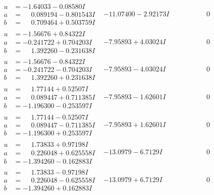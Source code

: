 \documentclass[1p]{elsarticle_modified}
\theoremstyle{definition}
\begin{document}
$$\begin{array}{c|c|c}
\begin{aligned}
u &= -1.64033 - 0.08580 I \\
a &= \phantom{-}0.089194 - 0.801543 I \\
b &= \phantom{-}0.709464 + 0.503759 I\end{aligned}
 & -11.07400 - 2.92173 I & \phantom{-0.000000 } 0 \\ \hline\begin{aligned}
u &= -1.56676 + 0.84322 I \\
a &= -0.241722 + 0.704203 I \\
b &= \phantom{-}1.392260 - 0.231638 I\end{aligned}
 & -7.95893 + 4.03024 I & \phantom{-0.000000 } 0 \\ \hline\begin{aligned}
u &= -1.56676 - 0.84322 I \\
a &= -0.241722 - 0.704203 I \\
b &= \phantom{-}1.392260 + 0.231638 I\end{aligned}
 & -7.95893 - 4.03024 I & \phantom{-0.000000 } 0 \\ \hline\begin{aligned}
u &= \phantom{-}1.77144 + 0.52507 I \\
a &= \phantom{-}0.089447 + 0.711385 I \\
b &= -1.196300 - 0.253597 I\end{aligned}
 & -7.95893 - 1.62601 I & \phantom{-0.000000 } 0 \\ \hline\begin{aligned}
u &= \phantom{-}1.77144 - 0.52507 I \\
a &= \phantom{-}0.089447 - 0.711385 I \\
b &= -1.196300 + 0.253597 I\end{aligned}
 & -7.95893 + 1.62601 I & \phantom{-0.000000 } 0 \\ \hline\begin{aligned}
u &= \phantom{-}1.73833 + 0.97198 I \\
a &= \phantom{-}0.226048 + 0.625558 I \\
b &= -1.394260 - 0.162883 I\end{aligned}
 & -13.0979 - 6.7129 I & \phantom{-0.000000 } 0 \\ \hline\begin{aligned}
u &= \phantom{-}1.73833 - 0.97198 I \\
a &= \phantom{-}0.226048 - 0.625558 I \\
b &= -1.394260 + 0.162883 I\end{aligned}
 & -13.0979 + 6.7129 I & \phantom{-0.000000 } 0\\

\end{array}$$
\end{document}
